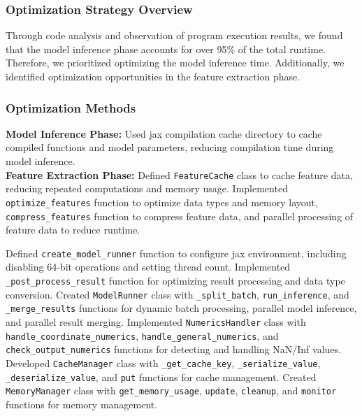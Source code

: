 \documentclass[a4paper,12pt]{article}
\begin{document}
\subsubsection{Optimization Strategy Overview}
Through code analysis and observation of program execution results, we found that the model inference phase accounts for over 95\% of the total runtime. Therefore, we prioritized optimizing the model inference time. Additionally, we identified optimization opportunities in the feature extraction phase.

\subsubsection{Optimization Methods}
\textbf{Model Inference Phase:} Used jax compilation cache directory to cache compiled functions and model parameters, reducing compilation time during model inference. \\
\textbf{Feature Extraction Phase:} Defined \texttt{FeatureCache} class to cache feature data, reducing repeated computations and memory usage. Implemented \texttt{optimize\_features} function to optimize data types and memory layout, \texttt{compress\_features} function to compress feature data, and parallel processing of feature data to reduce runtime.

Defined \texttt{create\_model\_runner} function to configure jax environment, including disabling 64-bit operations and setting thread count. Implemented \texttt{\_post\_process\_result} function for optimizing result processing and data type conversion. Created \texttt{ModelRunner} class with \texttt{\_split\_batch}, \texttt{run\_inference}, and \texttt{\_merge\_results} functions for dynamic batch processing, parallel model inference, and parallel result merging. Implemented \texttt{NumericsHandler} class with \texttt{handle\_coordinate\_numerics}, \texttt{handle\_general\_numerics}, and \texttt{check\_output\_numerics} functions for detecting and handling NaN/Inf values. Developed \texttt{CacheManager} class with \texttt{\_get\_cache\_key}, \texttt{\_serialize\_value}, \texttt{\_deserialize\_value}, and \texttt{put} functions for cache management. Created \texttt{MemoryManager} class with \texttt{get\_memory\_usage}, \texttt{update}, \texttt{cleanup}, and \texttt{monitor} functions for memory management.

\end{document}
